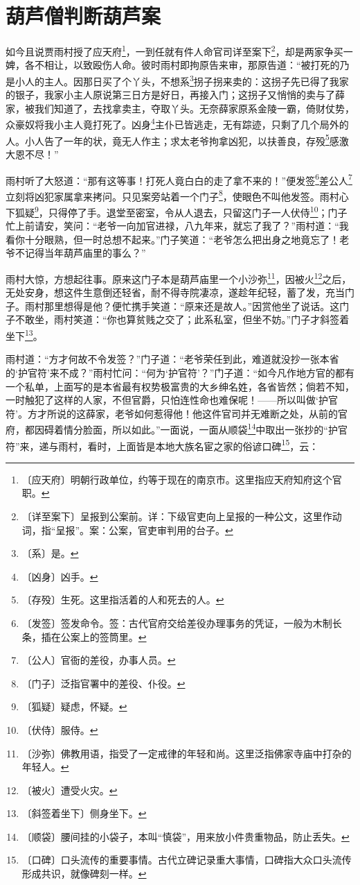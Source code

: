 \documentclass[12pt,UTF-8,openany]{ctexbook}
\begin{document}
\chapter{葫芦僧判断葫芦案}

\begin{normalsize}
    
    如今且说贾雨村授了应天府\footnote{〔应天府〕明朝行政单位，约等于现在的南京市。这里指应天府知府这个官职。}，一到任就有件人命官司详至案下\footnote{〔详至案下〕呈报到公案前。详：下级官吏向上呈报的一种公文，这里作动词，指“呈报”。案：公案，官吏审判用的台子。}，却是两家争买一婢，各不相让，以致殴伤人命。彼时雨村即拘原告来审，那原告道：“被打死的乃是小人的主人。因那日买了个丫头，不想系\footnote{〔系〕是。}拐子拐来卖的：这拐子先已得了我家的银子，我家小主人原说第三日方是好日，再接入门；这拐子又悄悄的卖与了薛家，被我们知道了，去找拿卖主，夺取丫头。无奈薛家原系金陵一霸，倚财仗势，众豪奴将我小主人竟打死了。凶身\footnote{〔凶身〕凶手。}主仆已皆逃走，无有踪迹，只剩了几个局外的人。小人告了一年的状，竟无人作主；求太老爷拘拿凶犯，以扶善良，存殁\footnote{〔存殁〕生死。这里指活着的人和死去的人。}感激大恩不尽！”
    
    雨村听了大怒道：“那有这等事！打死人竟白白的走了拿不来的！”便发签\footnote{〔发签〕签发命令。签：古代官府交给差役办理事务的凭证，一般为木制长条，插在公案上的签筒里。}差公人\footnote{〔公人〕官衙的差役，办事人员。}立刻将凶犯家属拿来拷问。只见案旁站着一个门子\footnote{〔门子〕泛指官署中的差役、仆役。}，使眼色不叫他发签。雨村心下狐疑\footnote{〔狐疑〕疑虑，怀疑。}，只得停了手。退堂至密室，令从人退去，只留这门子一人伏侍\footnote{〔伏侍〕服侍。}；门子忙上前请安，笑问：“老爷一向加官进禄，八九年来，就忘了我了？”雨村道：“我看你十分眼熟，但一时总想不起来。”门子笑道：“老爷怎么把出身之地竟忘了！老爷不记得当年葫芦庙里的事么？”
    
    雨村大惊，方想起往事。原来这门子本是葫芦庙里一个小沙弥\footnote{〔沙弥〕佛教用语，指受了一定戒律的年轻和尚。这里泛指佛家寺庙中打杂的年轻人。}，因被火\footnote{〔被火〕遭受火灾。}之后，无处安身，想这件生意倒还轻省，耐不得寺院凄凉，遂趁年纪轻，蓄了发，充当门子。雨村那里想得是他？便忙携手笑道：“原来还是故人。”因赏他坐了说话。这门子不敢坐，雨村笑道：“你也算贫贱之交了；此系私室，但坐不妨。”门子才斜签着坐下\footnote{〔斜签着坐下〕侧身坐下。}。
    
    雨村道：“方才何故不令发签？”门子道：“老爷荣任到此，难道就没抄一张本省的‘护官符’来不成？”雨村忙问：“何为‘护官符’？”门子道：“如今凡作地方官的都有一个私单，上面写的是本省最有权势极富贵的大乡绅名姓，各省皆然；倘若不知，一时触犯了这样的人家，不但官爵，只怕连性命也难保呢！——所以叫做‘护官符’。方才所说的这薛家，老爷如何惹得他！他这件官司并无难断之处，从前的官府，都因碍着情分脸面，所以如此。”一面说，一面从顺袋\footnote{〔顺袋〕腰间挂的小袋子，本叫“慎袋”，用来放小件贵重物品，防止丢失。}中取出一张抄的“护官符”来，递与雨村，看时，上面皆是本地大族名宦之家的俗谚口碑\footnote{〔口碑〕口头流传的重要事情。古代立碑记录重大事情，口碑指大众口头流传形成共识，就像碑刻一样。}，云：
    

\end{normalsize}
\end{document}
